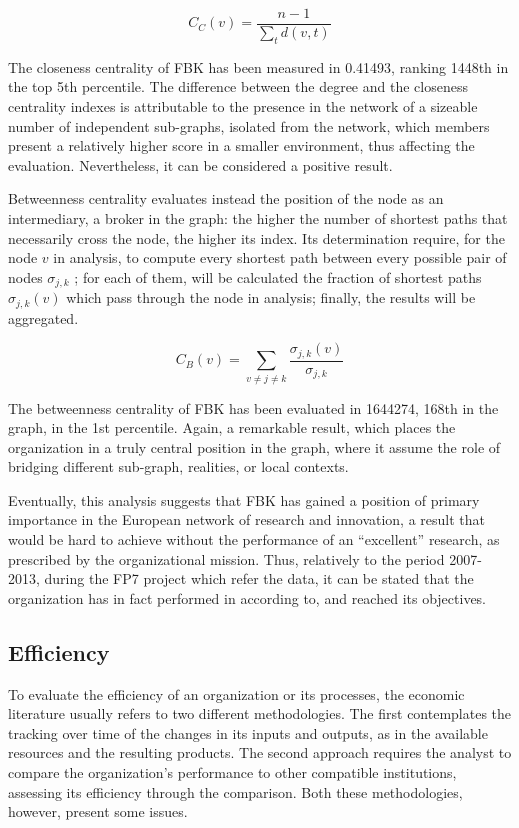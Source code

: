 \[
	C_C (v) =
		\frac 
			{n-1}
			{
				\sum_t d(v, t)
			} 
\]

The closeness centrality of FBK has been measured in 0.41493, ranking 1448th in the top 5th percentile. The difference between the degree and the closeness centrality indexes is attributable to the presence in the network of a sizeable number of independent sub-graphs, isolated from the network, which members present a relatively higher score in a smaller environment, thus affecting the evaluation. Nevertheless, it can be considered a positive result.  

Betweenness centrality evaluates instead the position of the node as an intermediary, a broker in the graph: the higher the number of shortest paths that necessarily cross the node, the higher its index. Its determination require, for the node $v$ in analysis, to compute every shortest path between every possible pair of nodes $\sigma_{j,k}$ ; for each of them, will be calculated the fraction of shortest paths $\sigma_{j,k} (v)$ which pass through the node in analysis; finally, the results will be aggregated. 

\[
	C_B (v) =
		\sum_{v \neq j \neq k}
			\frac {\sigma_{j,k} (v)}{\sigma_{j,k}}
\]

The betweenness centrality of FBK has been evaluated in 1644274, 168th in the graph, in the 1st percentile. Again, a remarkable result, which places the organization in a truly central position in the graph, where it assume the role of bridging different sub-graph, realities, or local contexts. 

Eventually, this analysis suggests that FBK has gained a position of primary importance in the European network of research and innovation, a result that would be hard to achieve without the performance of an \enquote{excellent} research, as prescribed by the organizational mission. Thus, relatively to the period 2007-2013, during the FP7 project which refer the data, it can be stated that the organization has in fact performed in according to, and reached its objectives. 

\subsection{Efficiency}

To evaluate the efficiency of an organization or its processes, the economic literature usually refers to two different methodologies. The first contemplates the tracking over time of the changes in its inputs and outputs, as in the available resources and the resulting products. The second approach requires the analyst to compare the organization's performance to other compatible institutions, assessing its efficiency through the comparison. Both these methodologies, however, present some issues.

